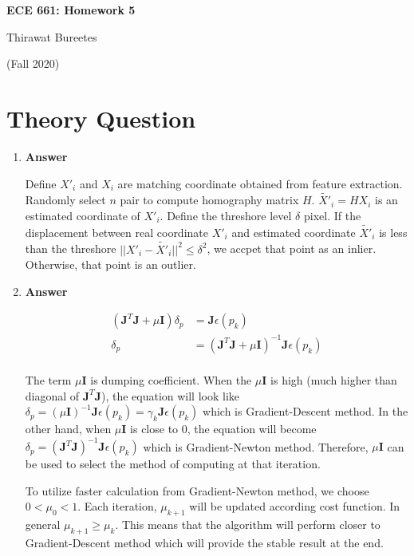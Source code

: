 \documentclass[11pt]{article}
\begin{document}
\begin{center}
\Large{\textbf{ECE 661: Homework 5}}

Thirawat Bureetes

(Fall 2020)
\end{center}
	
 

\section*{Theory Question}

\begin{enumerate}

\item 
\textbf{Answer}

Define ${X'}_i$ and $X_i$ are matching coordinate obtained from feature extraction. Randomly select $n$ pair to compute homography matrix $H$. $\tilde{X'}_i = HX_i$ is an estimated coordinate of ${X'}_i$. Define the threshore level $\delta$ pixel. If the displacement between real coordinate ${X'}_i$ and estimated coordinate $\tilde{X'}_i$ is less than the threshore $||{X'}_i - \tilde{X'}_i||^2 \leq \delta^2$, we accpet that point as an inlier. Otherwise, that point is an outlier.

\item 
\textbf{Answer}

\begin{align*}
(\mathbf{J}^T \mathbf{J} + \mu \mathbf{I})\delta_p &= \mathbf{J} \epsilon(p_k) \\
\delta_p &= (\mathbf{J}^T \mathbf{J} + \mu \mathbf{I})^{-1} \mathbf{J} \epsilon(p_k) \\
\end{align*}

The term $ \mu \mathbf{I}$ is dumping coefficient. When the $ \mu \mathbf{I}$ is high (much higher than diagonal of $\mathbf{J}^T \mathbf{J}$), the equation will look like $\delta_p = ( \mu \mathbf{I})^{-1} \mathbf{J} \epsilon(p_k) = \gamma_k \mathbf{J} \epsilon(p_k)$ which is Gradient-Descent method. In the other hand, when $ \mu \mathbf{I}$ is close to 0, the equation will become  $\delta_p = ( \mathbf{J}^T \mathbf{J})^{-1} \mathbf{J} \epsilon(p_k)$ which is Gradient-Newton method. Therefore, $ \mu \mathbf{I}$ can be used to select the method of computing at that iteration. 

To utilize faster calculation from Gradient-Newton method, we choose $0 <\mu_0 <1$. Each iteration, $\mu_{k+1}$ will be updated according cost function. In general $\mu_{k+1} \geq \mu_k$. This means that the algorithm will perform closer to Gradient-Descent method which will provide the stable result at the end.

\end{enumerate}
\end{document}
